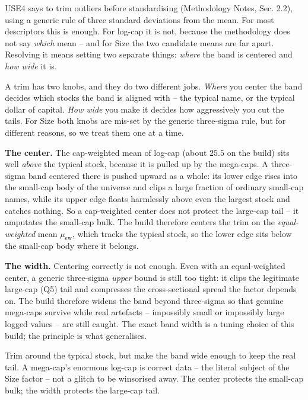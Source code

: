 \documentclass[11pt]{article}
\theoremstyle{definition}
\theoremstyle{plain}
\theoremstyle{remark}
\begin{document}
USE4 says to trim outliers before standardising (Methodology Notes, Sec. 2.2), using a generic rule of three standard deviations from the mean. For most descriptors this is enough. For log-cap it is not, because the methodology does not say \emph{which} mean -- and for Size the two candidate means are far apart. Resolving it means setting two separate things: \emph{where} the band is centered and \emph{how wide} it is.

\begin{intuition}
A trim has two knobs, and they do two different jobs. \emph{Where} you center the band decides which stocks the band is aligned with -- the typical name, or the typical dollar of capital. \emph{How wide} you make it decides how aggressively you cut the tails. For Size both knobs are mis-set by the generic three-sigma rule, but for different reasons, so we treat them one at a time.
\end{intuition}

\textbf{The center.} The cap-weighted mean of log-cap (about $25.5$ on the build) sits well \emph{above} the typical stock, because it is pulled up by the mega-caps. A three-sigma band centered there is pushed upward as a whole: its lower edge rises into the small-cap body of the universe and clips a large fraction of ordinary small-cap names, while its upper edge floats harmlessly above even the largest stock and catches nothing. So a cap-weighted center does not protect the large-cap tail -- it amputates the small-cap bulk. The build therefore centers the trim on the \emph{equal-weighted} mean $\mu_{\mathrm{ew}}$, which tracks the typical stock, so the lower edge sits below the small-cap body where it belongs.

\textbf{The width.} Centering correctly is not enough. Even with an equal-weighted center, a generic three-sigma \emph{upper} bound is still too tight: it clips the legitimate large-cap (Q5) tail and compresses the cross-sectional spread the factor depends on. The build therefore widens the band beyond three-sigma so that genuine mega-caps survive while real artefacts -- impossibly small or impossibly large logged values -- are still caught. The exact band width is a tuning choice of this build; the principle is what generalises.

\begin{intuition}
Trim around the typical stock, but make the band wide enough to keep the real tail. A mega-cap's enormous log-cap is correct data -- the literal subject of the Size factor -- not a glitch to be winsorised away. The center protects the small-cap bulk; the width protects the large-cap tail.
\end{intuition}
\end{document}
